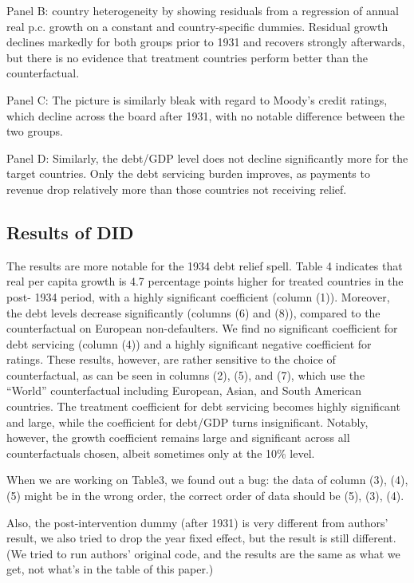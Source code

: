 Panel B: country
heterogeneity by showing residuals from a regression of annual real p.c. growth on a
constant and country-specific dummies. Residual growth declines markedly for both
groups prior to 1931 and recovers strongly afterwards, but there is no evidence that
treatment countries perform better than the counterfactual.

Panel C: The picture is similarly
bleak with regard to Moody's credit ratings, which decline across the board after 1931,
with no notable difference between the two groups. 

Panel D: Similarly, the debt/GDP
level does not decline significantly more for the target countries. Only the
debt servicing burden improves, as payments to revenue drop relatively more than
those countries not receiving relief.

\subsection{Results of DID}
The results are more notable for the 1934 debt relief spell. Table 4 indicates that
real per capita growth is 4.7 percentage points higher for treated countries in the post-
1934 period, with a highly significant coefficient (column (1)). Moreover, the debt
levels decrease significantly (columns (6) and (8)), compared to the counterfactual on
European non-defaulters. We find no significant coefficient for debt servicing (column
(4)) and a highly significant negative coefficient for ratings. These results, however,
are rather sensitive to the choice of counterfactual, as can be seen in columns (2),
(5), and (7), which use the “World” counterfactual including European, Asian, and
South American countries. The treatment coefficient for debt servicing becomes highly
significant and large, while the coefficient for debt/GDP turns insignificant. Notably,
however, the growth coefficient remains large and significant across all counterfactuals
chosen, albeit sometimes only at the 10\% level.



When we are working on Table3, we found out a bug:
the data of column (3), (4), (5) might be in the wrong order, the correct order of data should be (5), (3), (4).

Also, the post-intervention dummy (after 1931) is very different from authors' result, we also tried to drop the year fixed effect, but the result is still different.
(We tried to run authors' original code, and the results are the same as what we get, not what's in the table of this paper.)

